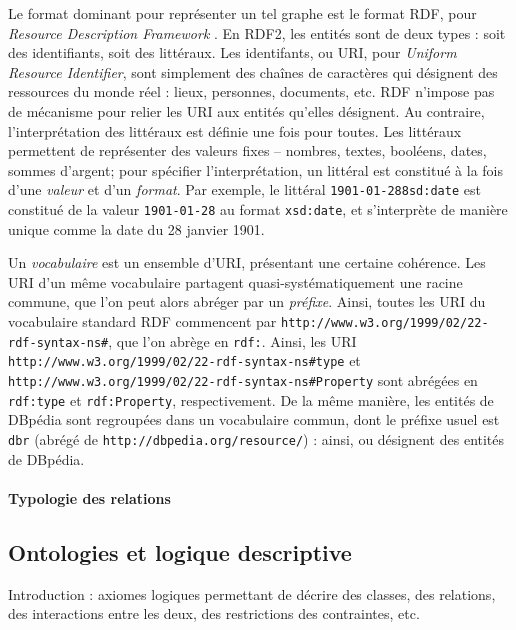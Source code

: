 Le format dominant pour représenter un tel graphe est le format RDF, pour \textit{Resource Description Framework} \cite{cyganiak14}. En RDF2, les entités sont de deux types : soit des identifiants, soit des littéraux. Les identifants, ou URI, pour \textit{Uniform Resource Identifier}, sont simplement des chaînes de caractères qui désignent des ressources du monde réel : lieux, personnes, documents, etc. %
RDF n'impose pas de mécanisme pour relier les URI aux entités qu'elles désignent. Au contraire, l'interprétation des littéraux est définie une fois pour toutes. Les littéraux permettent de représenter des valeurs fixes – nombres, textes, booléens, dates, sommes d'argent; pour spécifier l'interprétation, un littéral est constitué à la fois d'une \textit{valeur} et d'un \textit{format}. Par exemple, le littéral \texttt{1901-01-28^^xsd:date} est constitué de la valeur \texttt{1901-01-28} au format \texttt{xsd:date}, et s'interprète de manière unique comme la date du 28 janvier 1901.

Un \textit{vocabulaire} est un ensemble d'URI, présentant une certaine cohérence. Les URI d'un même vocabulaire partagent quasi-systématiquement une racine commune, que l'on peut alors abréger par un \textit{préfixe}. Ainsi, toutes les URI du vocabulaire standard RDF commencent par \texttt{http://www.w3.org/1999/02/22-rdf-syntax-ns\#}, que l'on abrège en \texttt{rdf:}. Ainsi, les URI \texttt{http://www.w3.org/1999/02/22-rdf-syntax-ns\#type} et \texttt{http://www.w3.org/1999/02/22-rdf-syntax-ns\#Property} sont abrégées en \texttt{rdf:type} et \texttt{rdf:Property}, respectivement. 
De la même manière, les entités de DBpédia sont regroupées dans un vocabulaire commun, dont le préfixe usuel est \texttt{dbr} (abrégé de \texttt{http://dbpedia.org/resource/}) : ainsi,  ou  désignent des entités de DBpédia.


\paragraph{Typologie des relations} 


\subsection{Ontologies et logique descriptive}

Introduction : axiomes logiques permettant de décrire des classes, des relations, des interactions entre les deux, des restrictions des contraintes, etc.

